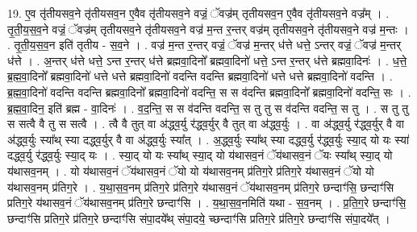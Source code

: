 \documentclass[17pt]{extarticle}
\begin{document}
19. ए॒व तृ॑तीयसव॒ने तृ॑तीयसव॒न ए॒वैव तृ॑तीयसव॒ने वज्रं॒ ॅवज्र॑म् तृतीयसव॒न ए॒वैव तृ॑तीयसव॒ने वज्र᳚म् । . तृ॒ती॒य॒स॒व॒ने वज्रं॒ ॅवज्र॑म् तृतीयसव॒ने तृ॑तीयसव॒ने वज्र॑ म॒न्त र॒न्तर् वज्र॑म् तृतीयसव॒ने तृ॑तीयसव॒ने वज्र॑ म॒न्तः । . तृ॒ती॒य॒स॒व॒न इति॑ तृतीय - स॒व॒ने । . वज्र॑ म॒न्त र॒न्तर् वज्रं॒ ॅवज्र॑ म॒न्तर् ध॑त्ते धत्ते॒ ऽन्तर् वज्रं॒ ॅवज्र॑ म॒न्तर् ध॑त्ते । . अ॒न्तर् ध॑त्ते धत्ते॒ ऽन्त र॒न्तर् ध॑त्ते ब्रह्मवा॒दिनो᳚ ब्रह्मवा॒दिनो॑ धत्ते॒ ऽन्त र॒न्तर् ध॑त्ते ब्रह्मवा॒दिनः॑ । . ध॒त्ते॒ ब्र॒ह्म॒वा॒दिनो᳚ ब्रह्मवा॒दिनो॑ धत्ते धत्ते ब्रह्मवा॒दिनो॑ वदन्ति वदन्ति ब्रह्मवा॒दिनो॑ धत्ते धत्ते ब्रह्मवा॒दिनो॑ वदन्ति । . ब्र॒ह्म॒वा॒दिनो॑ वदन्ति वदन्ति ब्रह्मवा॒दिनो᳚ ब्रह्मवा॒दिनो॑ वदन्ति॒ स स व॑दन्ति ब्रह्मवा॒दिनो᳚ ब्रह्मवा॒दिनो॑ वदन्ति॒ सः । . ब्र॒ह्म॒वा॒दिन॒ इति॑ ब्रह्म - वा॒दिनः॑ । . व॒द॒न्ति॒ स स व॑दन्ति वदन्ति॒ स तु तु स व॑दन्ति वदन्ति॒ स तु । . स तु तु स सत्वै वै तु स सत्वै । . त्वै वै तुत् वा अ॑द्ध्व॒र्यु र॑द्ध्व॒र्युर् वै तुत् वा अ॑द्ध्व॒र्युः । . वा अ॑द्ध्व॒र्यु र॑द्ध्व॒र्युर् वै वा अ॑द्ध्व॒र्युः स्या᳚थ् स्या दद्ध्व॒र्युर् वै वा अ॑द्ध्व॒र्युः स्या᳚त् । . अ॒द्ध्व॒र्युः स्या᳚थ् स्या दद्ध्व॒र्यु र॑द्ध्व॒र्युः स्या॒द् यो यः स्या॑ दद्ध्व॒र्यु र॑द्ध्व॒र्युः स्या॒द् यः । . स्या॒द् यो यः स्या᳚थ् स्या॒द् यो य॑थासव॒नं ॅय॑थासव॒नं ॅयः स्या᳚थ् स्या॒द् यो य॑थासव॒नम् । . यो य॑थासव॒नं ॅय॑थासव॒नं ॅयो यो य॑थासव॒नम् प्र॑तिग॒रे प्र॑तिग॒रे य॑थासव॒नं ॅयो यो य॑थासव॒नम् प्र॑तिग॒रे । . य॒था॒स॒व॒नम् प्र॑तिग॒रे प्र॑तिग॒रे य॑थासव॒नं ॅय॑थासव॒नम् प्र॑तिग॒रे छन्दाꣳ॑सि॒ छन्दाꣳ॑सि प्रतिग॒रे य॑थासव॒नं ॅय॑थासव॒नम् प्र॑तिग॒रे छन्दाꣳ॑सि । . य॒था॒स॒व॒नमिति॑ यथा - स॒व॒नम् । . प्र॒ति॒ग॒रे छन्दाꣳ॑सि॒ छन्दाꣳ॑सि प्रतिग॒रे प्र॑तिग॒रे छन्दाꣳ॑सि संपा॒दये᳚थ् संपा॒दये॒ च्छन्दाꣳ॑सि प्रतिग॒रे प्र॑तिग॒रे छन्दाꣳ॑सि संपा॒दये᳚त् । \newline
\end{document}
